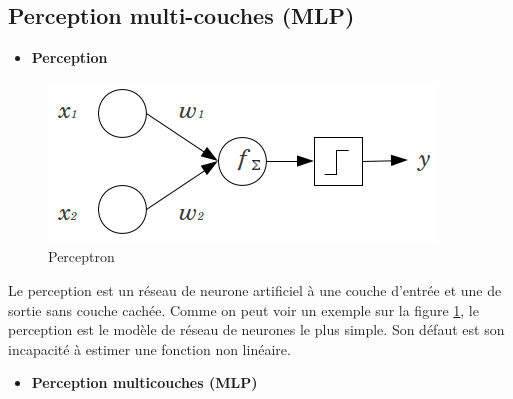 \subsection{Perception multi-couches (MLP)}
\begin{itemize}
    \item \textbf{Perception} 
\end{itemize}

\begin{figure}[h!]
    \centering
    \includegraphics[scale = 0.6]{images/perceptron.png}
    \caption{Perceptron}
    \label{perceptron}
\end{figure}


Le perception est un réseau de neurone artificiel à une couche d'entrée et une de sortie sans couche cachée. Comme on peut voir un exemple sur la figure \ref{perceptron}, le perception est le modèle de réseau de neurones le plus simple. Son défaut est son incapacité à estimer une fonction non linéaire.\\


\begin{itemize}
    \item \textbf{Perception multicouches (MLP)}
\end{itemize}



